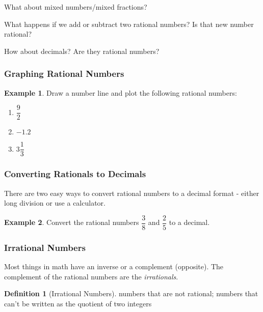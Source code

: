 \documentclass[addpoints,12pt]{exam}
\theoremstyle{definition}
\newtheorem{example}{Example}[subsection]
\newtheorem{definition}{Definition}[subsection]
\begin{document}
\noindent What about mixed numbers/mixed fractions?

\vspace{1in}

\noindent What happens if we add or subtract two rational numbers? Is that new number rational?
\newpage


\noindent How about decimals? Are they rational numbers?
\vspace{1in}

\subsubsection*{Graphing Rational Numbers}

\begin{example}
Draw a number line and plot the following rational numbers:
\vspace{.5in}
\begin{enumerate}
\item $\dfrac{9}{2}$
\item $-1.2$
\item $3\dfrac{1}{3}$
\end{enumerate}
\end{example}
\vspace{.25in}

\subsubsection*{Converting Rationals to Decimals}
\noindent There are two easy ways to convert rational numbers to a decimal format - either long division or use a calculator.

\vspace{.25in}

\begin{example}
Convert the rational numbers $\dfrac{3}{8}$ and $\dfrac{2}{5}$ to a decimal.
\vspace{1in}
\end{example}
\newpage

\subsubsection*{Irrational Numbers}
\noindent Most things in math have an inverse or a complement (opposite). The complement of the rational numbers are the \emph{irrationals}.
\vspace{.25in}

\begin{definition}[Irrational Numbers]
numbers that are not rational; numbers that can't be written as the quotient of two integers
\end{definition}
\end{document}
